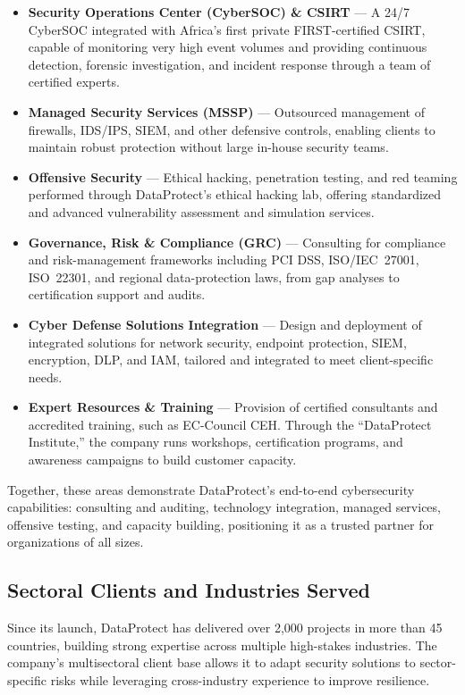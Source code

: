 \documentclass[12pt]{article}
\begin{document}
\begin{itemize}
    \item \textbf{Security Operations Center (CyberSOC) \& CSIRT} --- A 24/7 CyberSOC integrated with Africa's first private FIRST-certified CSIRT, capable of monitoring very high event volumes and providing continuous detection, forensic investigation, and incident response through a team of certified experts.
    \item \textbf{Managed Security Services (MSSP)} --- Outsourced management of firewalls, IDS/IPS, SIEM, and other defensive controls, enabling clients to maintain robust protection without large in-house security teams.
    \item \textbf{Offensive Security} --- Ethical hacking, penetration testing, and red teaming performed through DataProtect's ethical hacking lab, offering standardized and advanced vulnerability assessment and simulation services.
    \item \textbf{Governance, Risk \& Compliance (GRC)} --- Consulting for compliance and risk-management frameworks including PCI DSS, ISO/IEC~27001, ISO~22301, and regional data-protection laws, from gap analyses to certification support and audits.
    \item \textbf{Cyber Defense Solutions Integration} --- Design and deployment of integrated solutions for network security, endpoint protection, SIEM, encryption, DLP, and IAM, tailored and integrated to meet client-specific needs.
    \item \textbf{Expert Resources \& Training} --- Provision of certified consultants and accredited training, such as EC-Council CEH. Through the ``DataProtect Institute,'' the company runs workshops, certification programs, and awareness campaigns to build customer capacity.
\end{itemize}

Together, these areas demonstrate DataProtect's end-to-end cybersecurity
capabilities: consulting and auditing, technology integration, managed
services, offensive testing, and capacity building, positioning it as a
trusted partner for organizations of all sizes.

\subsection{Sectoral Clients and Industries Served}

Since its launch, DataProtect has delivered over 2,000 projects in more than 45
countries, building strong expertise across multiple high-stakes industries.
The company's multisectoral client base allows it to adapt security solutions
to sector-specific risks while leveraging cross-industry experience to improve
resilience.
\end{document}
